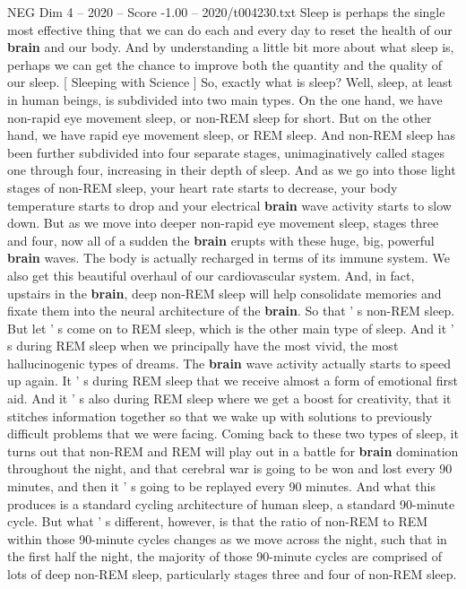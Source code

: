 \begin{textsample}{NEG Dim 4 – 2020 – Score -1.00 – 2020/t004230.txt}  \label{ex:f4_neg_061}
Sleep is perhaps the single most effective thing that we can do each and every day to reset the health of our \textbf{brain} and our body.
And by understanding a little bit more about what sleep is, perhaps we can get the chance to improve both the quantity and the quality of our sleep. [ Sleeping with Science ] So, exactly what is sleep?
Well, sleep, at least in human beings, is subdivided into two main types.
On the one hand, we have non-rapid eye movement sleep, or non-REM sleep for short.
But on the other hand, we have rapid eye movement sleep, or REM sleep.
And non-REM sleep has been further subdivided into four separate stages, unimaginatively called stages one through four, increasing in their depth of sleep.
And as we go into those light stages of non-REM sleep, your heart rate starts to decrease, your body temperature starts to drop and your electrical \textbf{brain} wave activity starts to slow down.
But as we move into deeper non-rapid eye movement sleep, stages three and four, now all of a sudden the \textbf{brain} erupts with these huge, big, powerful \textbf{brain} waves.
The body is actually recharged in terms of its immune system.
We also get this beautiful overhaul of our cardiovascular system.
And, in fact, upstairs in the \textbf{brain}, deep non-REM sleep will help consolidate memories and fixate them into the neural architecture of the \textbf{brain}.
So that ' s non-REM sleep.
But let ' s come on to REM sleep, which is the other main type of sleep.
And it ' s during REM sleep when we principally have the most vivid, the most hallucinogenic types of dreams.
The \textbf{brain} wave activity actually starts to speed up again.
It ' s during REM sleep that we receive almost a form of emotional first aid.
And it ' s also during REM sleep where we get a boost for creativity, that it stitches information together so that we wake up with solutions to previously difficult problems that we were facing.
Coming back to these two types of sleep, it turns out that non-REM and REM will play out in a battle for \textbf{brain} domination throughout the night, and that cerebral war is going to be won and lost every 90 minutes, and then it ' s going to be replayed every 90 minutes.
And what this produces is a standard cycling architecture of human sleep, a standard 90-minute cycle.
But what ' s different, however, is that the ratio of non-REM to REM within those 90-minute cycles changes as we move across the night, such that in the first half the night, the majority of those 90-minute cycles are comprised of lots of deep non-REM sleep, particularly stages three and four of non-REM sleep.

\end{textsample}

